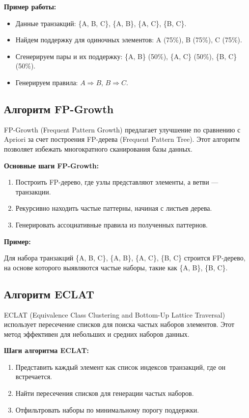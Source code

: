 \documentclass[a4paper,12pt]{article}
\begin{document}
\textbf{Пример работы:}

\begin{itemize}
    \item Данные транзакций: \{A, B, C\}, \{A, B\}, \{A, C\}, \{B, C\}.
    \item Найдем поддержку для одиночных элементов: A (75\%), B (75\%), C (75\%).
    \item Сгенерируем пары и их поддержку: \{A, B\} (50\%), \{A, C\} (50\%), \{B, C\} (50\%).
    \item Генерируем правила: $A \Rightarrow B$, $B \Rightarrow C$.
\end{itemize}

\subsection{Алгоритм FP-Growth}

FP-Growth (Frequent Pattern Growth) предлагает улучшение по сравнению с Apriori за счет построения FP-дерева (Frequent Pattern Tree). Этот алгоритм позволяет избежать многократного сканирования базы данных.

\textbf{Основные шаги FP-Growth:}
\begin{enumerate}
    \item Построить FP-дерево, где узлы представляют элементы, а ветви — транзакции.
    \item Рекурсивно находить частые паттерны, начиная с листьев дерева.
    \item Генерировать ассоциативные правила из полученных паттернов.
\end{enumerate}

\textbf{Пример:}

Для набора транзакций \{A, B, C\}, \{A, B\}, \{A, C\}, \{B, C\} строится FP-дерево, на основе которого выявляются частые наборы, такие как \{A, B\}, \{B, C\}.

\subsection{Алгоритм ECLAT}

ECLAT (Equivalence Class Clustering and Bottom-Up Lattice Traversal) использует пересечение списков для поиска частых наборов элементов. Этот метод эффективен для небольших и средних наборов данных.

\textbf{Шаги алгоритма ECLAT:}
\begin{enumerate}
    \item Представить каждый элемент как список индексов транзакций, где он встречается.
    \item Найти пересечения списков для генерации частых наборов.
    \item Отфильтровать наборы по минимальному порогу поддержки.
\end{enumerate}
\end{document}
